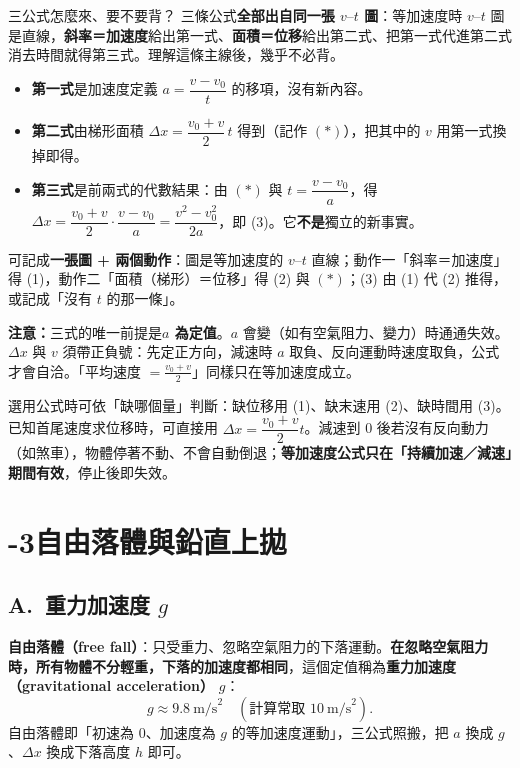\documentclass[11pt]{article}
\begin{document}
\begin{補充框}{三公式怎麼來、要不要背？}
三條公式\textbf{全部出自同一張 $v\text{–}t$ 圖}：等加速度時 $v\text{–}t$ 圖是直線，\textbf{斜率＝加速度}給出第一式、\textbf{面積＝位移}給出第二式、把第一式代進第二式消去時間就得第三式。理解這條主線後，幾乎不必背。

\begin{itemize}\setlength{\itemsep}{1pt}
\item \textbf{第一式}是加速度定義 $a=\dfrac{v-v_0}{t}$ 的移項，沒有新內容。
\item \textbf{第二式}由梯形面積 $\Delta x=\dfrac{v_0+v}{2}\,t$ 得到（記作 $(\ast)$），把其中的 $v$ 用第一式換掉即得。
\item \textbf{第三式}是前兩式的代數結果：由 $(\ast)$ 與 $t=\dfrac{v-v_0}{a}$，得 $\Delta x=\dfrac{v_0+v}{2}\cdot\dfrac{v-v_0}{a}=\dfrac{v^2-v_0^2}{2a}$，即 (3)。它\textbf{不是}獨立的新事實。
\end{itemize}

可記成\textbf{一張圖 + 兩個動作}：圖是等加速度的 $v\text{–}t$ 直線；動作一「斜率＝加速度」得 (1)，動作二「面積（梯形）＝位移」得 (2) 與 $(\ast)$；(3) 由 (1) 代 (2) 推得，或記成「沒有 $t$ 的那一條」。

\textbf{注意：}三式的唯一前提是\textbf{$a$ 為定值}。$a$ 會變（如有空氣阻力、變力）時通通失效。$\Delta x$ 與 $v$ 須帶正負號：先定正方向，減速時 $a$ 取負、反向運動時速度取負，公式才會自洽。「平均速度 $=\tfrac{v_0+v}{2}$」同樣只在等加速度成立。
\end{補充框}

選用公式時可依「缺哪個量」判斷：缺位移用 (1)、缺末速用 (2)、缺時間用 (3)。已知首尾速度求位移時，可直接用 $\Delta x=\dfrac{v_0+v}{2}t$。減速到 0 後若沒有反向動力（如煞車），物體停著不動、不會自動倒退；\textbf{等加速度公式只在「持續加速／減速」期間有效}，停止後即失效。

\section*{-3\quad 自由落體與鉛直上拋}

\subsection*{\sffamily A.\ 重力加速度 $g$}

\textbf{自由落體（free fall）}：只受重力、忽略空氣阻力的下落運動。\textbf{在忽略空氣阻力時，所有物體不分輕重，下落的加速度都相同}，這個定值稱為\textbf{重力加速度（gravitational acceleration）} $g$：
$$g \approx 9.8\ \text{m/s}^2\quad(\text{計算常取 } 10\ \text{m/s}^2).$$
自由落體即「初速為 0、加速度為 $g$ 的等加速度運動」，三公式照搬，把 $a$ 換成 $g$、$\Delta x$ 換成下落高度 $h$ 即可。
\end{document}
